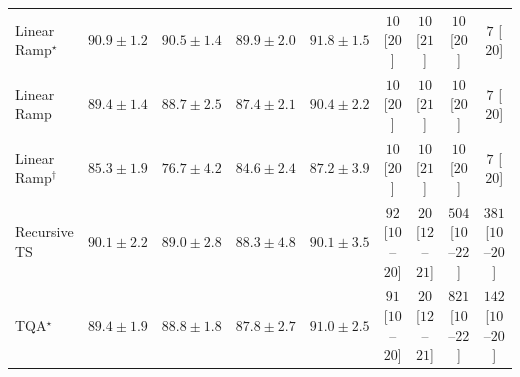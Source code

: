 \begin{tabular}{l|cccc|cccc|}
Linear Ramp$^\star$ & {\cellcolor[HTML]{034871}} \color[HTML]{F1F1F1} $90.9\pm 1.2$ & {\cellcolor[HTML]{034A74}} \color[HTML]{F1F1F1} $90.5\pm 1.4$ & {\cellcolor[HTML]{034E7B}} \color[HTML]{F1F1F1} $89.9\pm 2.0$ & {\cellcolor[HTML]{034267}} \color[HTML]{F1F1F1} $91.8\pm 1.5$ & {\cellcolor[HTML]{FFF7F3}} \color[HTML]{000000} $10$ [$20$] & {\cellcolor[HTML]{FFF7F3}} \color[HTML]{000000} $10$ [$21$] & {\cellcolor[HTML]{FFF7F3}} \color[HTML]{000000} $10$ [$20$] & {\cellcolor[HTML]{FFF7F3}} \color[HTML]{000000} $7$ [$20$] \\
Linear Ramp & {\cellcolor[HTML]{045280}} \color[HTML]{F1F1F1} $89.4\pm 1.4$ & {\cellcolor[HTML]{045687}} \color[HTML]{F1F1F1} $88.7\pm 2.5$ & {\cellcolor[HTML]{045D92}} \color[HTML]{F1F1F1} $87.4\pm 2.1$ & {\cellcolor[HTML]{034B76}} \color[HTML]{F1F1F1} $90.4\pm 2.2$ & {\cellcolor[HTML]{FFF7F3}} \color[HTML]{000000} $10$ [$20$] & {\cellcolor[HTML]{FFF7F3}} \color[HTML]{000000} $10$ [$21$] & {\cellcolor[HTML]{FFF7F3}} \color[HTML]{000000} $10$ [$20$] & {\cellcolor[HTML]{FFF7F3}} \color[HTML]{000000} $7$ [$20$] \\
Linear Ramp$^\dagger$ & {\cellcolor[HTML]{05659F}} \color[HTML]{F1F1F1} $85.3\pm 1.9$ & {\cellcolor[HTML]{3F93C2}} \color[HTML]{F1F1F1} $76.7\pm 4.2$ & {\cellcolor[HTML]{0569A4}} \color[HTML]{F1F1F1} $84.6\pm 2.4$ & {\cellcolor[HTML]{045E93}} \color[HTML]{F1F1F1} $87.2\pm 3.9$ & {\cellcolor[HTML]{FFF7F3}} \color[HTML]{000000} $10$ [$20$] & {\cellcolor[HTML]{FFF7F3}} \color[HTML]{000000} $10$ [$21$] & {\cellcolor[HTML]{FFF7F3}} \color[HTML]{000000} $10$ [$20$] & {\cellcolor[HTML]{FFF7F3}} \color[HTML]{000000} $7$ [$20$] \\
Recursive TS & {\cellcolor[HTML]{034C78}} \color[HTML]{F1F1F1} $90.1\pm 2.2$ & {\cellcolor[HTML]{045483}} \color[HTML]{F1F1F1} $89.0\pm 2.8$ & {\cellcolor[HTML]{04588A}} \color[HTML]{F1F1F1} $88.3\pm 4.8$ & {\cellcolor[HTML]{034C78}} \color[HTML]{F1F1F1} $90.1\pm 3.5$ & {\cellcolor[HTML]{FDE4E1}} \color[HTML]{000000} $92$ [$10$--$20$] & {\cellcolor[HTML]{FFF4F0}} \color[HTML]{000000} $20$ [$12$--$21$] & {\cellcolor[HTML]{E13B98}} \color[HTML]{F1F1F1} $504$ [$10$--$22$] & {\cellcolor[HTML]{F87CA8}} \color[HTML]{F1F1F1} $381$ [$10$--$20$] \\
TQA$^\star$ & {\cellcolor[HTML]{045280}} \color[HTML]{F1F1F1} $89.4\pm 1.9$ & {\cellcolor[HTML]{045585}} \color[HTML]{F1F1F1} $88.8\pm 1.8$ & {\cellcolor[HTML]{045B8E}} \color[HTML]{F1F1F1} $87.8\pm 2.7$ & {\cellcolor[HTML]{03476F}} \color[HTML]{F1F1F1} $91.0\pm 2.5$ & {\cellcolor[HTML]{FDE4E1}} \color[HTML]{000000} $91$ [$10$--$20$] & {\cellcolor[HTML]{FFF4F0}} \color[HTML]{000000} $20$ [$12$--$21$] & {\cellcolor[HTML]{4B006A}} \color[HTML]{F1F1F1} $821$ [$10$--$22$] & {\cellcolor[HTML]{FDD7D4}} \color[HTML]{000000} $142$ [$10$--$20$] \\

\end{tabular}
